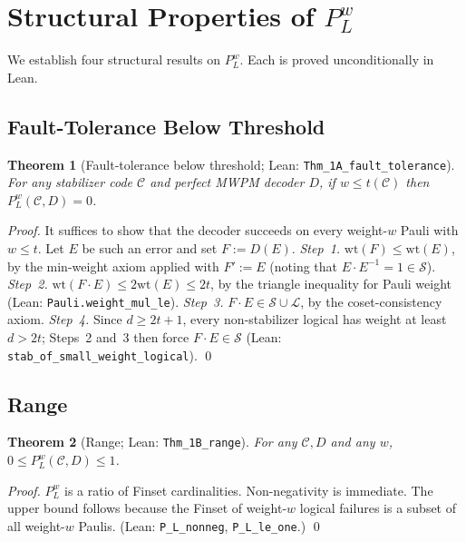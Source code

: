 \documentclass[11pt]{article}
\newtheorem{theorem}{Theorem}[section]
\theoremstyle{definition}
\theoremstyle{remark}
\begin{document}
\section{Structural Properties of $P_L^w$}
\label{sec:phase1}

We establish four structural results on $P_L^w$.  Each is proved
unconditionally in Lean.

\subsection{Fault-Tolerance Below Threshold}

\begin{theorem}[Fault-tolerance below threshold; Lean: \texttt{Thm\_1A\_fault\_tolerance}]
\label{thm:1A}
For any stabilizer code $\mathcal{C}$ and perfect MWPM decoder $D$,
if $w \leq t(\mathcal{C})$ then $P_L^w(\mathcal{C}, D) = 0$.
\end{theorem}

\begin{proof}
It suffices to show that the decoder succeeds on every
weight-$w$ Pauli with $w \leq t$.  Let $E$ be such an error and
set $F := D(E)$.
\emph{Step~1.} $\mathrm{wt}(F) \leq \mathrm{wt}(E)$, by the
min-weight axiom applied with $F' := E$ (noting that
$E \cdot E^{-1} = 1 \in \mathcal{S}$).
\emph{Step~2.} $\mathrm{wt}(F \cdot E) \leq 2 \mathrm{wt}(E) \leq
2t$, by the triangle inequality for Pauli weight
(Lean: \texttt{Pauli.weight\_mul\_le}).
\emph{Step~3.} $F \cdot E \in \mathcal{S} \cup \mathcal{L}$, by
the coset-consistency axiom.
\emph{Step~4.} Since $d \geq 2t + 1$, every non-stabilizer
logical has weight at least $d > 2t$; Steps~2 and~3 then force
$F \cdot E \in \mathcal{S}$
(Lean: \texttt{stab\_of\_small\_weight\_logical}).
\qed
\end{proof}

\subsection{Range}

\begin{theorem}[Range; Lean: \texttt{Thm\_1B\_range}]
\label{thm:1B}
For any $\mathcal{C}, D$ and any $w$,
$0 \leq P_L^w(\mathcal{C}, D) \leq 1$.
\end{theorem}

\begin{proof}
$P_L^w$ is a ratio of Finset cardinalities.  Non-negativity is
immediate.  The upper bound follows because the Finset of
weight-$w$ logical failures is a subset of all weight-$w$ Paulis.
(Lean: \texttt{P\_L\_nonneg}, \texttt{P\_L\_le\_one}.)
\qed
\end{proof}
\end{document}
